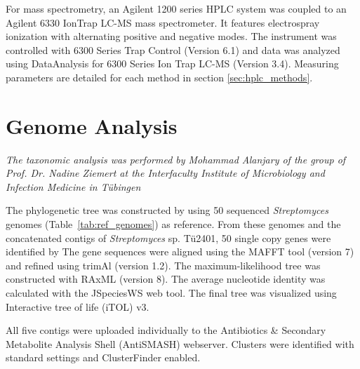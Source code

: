 For mass spectrometry, an Agilent 1200 series HPLC system was coupled to an Agilent 6330 IonTrap LC-MS mass spectrometer.
It features electrospray ionization with alternating positive and negative modes.
The instrument was controlled with 6300 Series Trap Control (Version 6.1) and data was analyzed using DataAnalysis for 6300 Series Ion Trap LC-MS (Version 3.4).
Measuring parameters are detailed for each method in section \ref{sec:hplc_methods}.


\section{Genome Analysis} %
\label{sec:genome_analysis}

\emph{The taxonomic analysis was performed by Mohammad Alanjary of the group of Prof. Dr. Nadine Ziemert at the Interfaculty Institute of Microbiology and Infection Medicine in Tübingen}

The phylogenetic tree was constructed by using 50 sequenced \textit{Streptomyces} genomes (Table~\ref{tab:ref_genomes}) as reference.
From these genomes and the concatenated contigs of \textit{Streptomyces} sp. Tü2401, 50 single copy genes were identified by
The gene sequences were aligned using the MAFFT tool (version 7) and refined using trimAl (version 1.2).\autocite{Katoh2017,Kuraku2013,Capella-Gutierrez2009}
The maximum-likelihood tree was constructed with RAxML (version 8).\autocite{Stamatakis2014}
The average nucleotide identity was calculated with the JSpeciesWS web tool.\autocite{Richter2017}
The final tree was visualized using Interactive tree of life (iTOL) v3.\autocite{Letunic2016}

All five contigs were uploaded individually to the Antibiotics \& Secondary Metabolite Analysis Shell (AntiSMASH) webserver.\autocite{Weber2015,Blin2013,Medema2011}
Clusters were identified with standard settings and ClusterFinder enabled.

